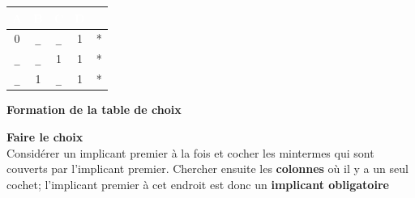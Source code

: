 \documentclass{report}
\begin{document}
\begin{multicols*}{3}
\begin{center}
          \begin{tabular}{c c c c c}
          \rowcolor{myg}
          \textcolor{white}{A} & \textcolor{white}{B} & \textcolor{white}{C} & \textcolor{white}{D} &  \\
          \hline  
          0 & \texttt{\_} & \texttt{\_} & 1 &  * \\
          \arrayrulecolor{red}
          \hline
          \texttt{\_}   & \texttt{\_}   & 1 & 1 &  *\\
          \texttt{\_}   & 1 & \texttt{\_}  & 1 & * \\ 
        \end{tabular}
      \end{center} 


\noindent\textbf{Formation de la table de choix}  
    \begin{center}
    \end{center}

    \noindent \textbf{Faire le choix}  \\ 
    Considérer un implicant premier à la fois et  
    cocher les mintermes qui sont couverts par l'implicant premier. 
    Chercher ensuite les \textbf{colonnes} où il y a un seul cochet; l'implicant 
    premier à cet endroit est donc un \textbf{implicant obligatoire}  



\end{multicols*}
\end{document}
